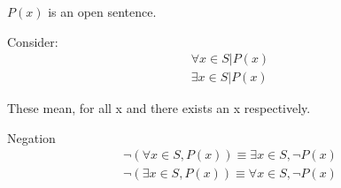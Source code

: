 \documentclass{report}
\begin{document}
$P(x)$ is an open sentence.

Consider:
\begin{gather}
    \forall x \in S | P(x)\\
    \exists x \in S | P(x)
\end{gather}

These mean, for all x and there exists an x
respectively.


{\large Negation}
\begin{gather}
    \neg (\forall x \in S, P(x)) \equiv \exists x \in S, \neg P(x)\\
    \neg (\exists x \in S, P(x)) \equiv \forall x \in S, \neg P(x)
\end{gather}
\end{document}
